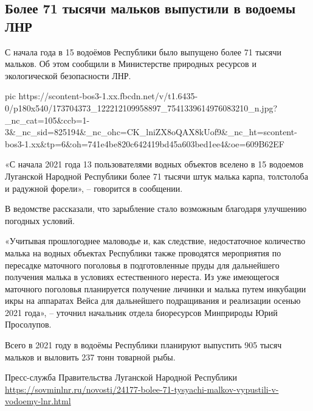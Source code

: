  
 
 
 
 

\subsection{Более 71 тысячи мальков выпустили в водоемы ЛНР}
\label{sec:14_04_2021.fb.respublikalnr.10.ryba_priroda}

С начала года в 15 водоёмов Республики было выпущено более 71 тысячи мальков.
Об этом сообщили в Министерстве природных ресурсов и экологической безопасности
ЛНР.

\ifcmt
  pic https://scontent-bos3-1.xx.fbcdn.net/v/t1.6435-0/p180x540/173704373_122212109958897_7541339614976083210_n.jpg?_nc_cat=105&ccb=1-3&_nc_sid=825194&_nc_ohc=CK_lniZX8oQAX8kUof9&_nc_ht=scontent-bos3-1.xx&tp=6&oh=741e4be820c642419bd45a603bed1ee4&oe=609B62EF
\fi

«С начала 2021 года 13 пользователями водных объектов вселено в 15 водоемов
Луганской Народной Республики более 71 тысячи штук малька карпа, толстолоба и
радужной форели», – говорится в сообщении.

В ведомстве рассказали, что зарыбление стало возможным благодаря улучшению погодных условий.

«Учитывая прошлогоднее маловодье и, как следствие, недостаточное количество
малька на водных объектах Республики также проводятся мероприятия по пересадке
маточного поголовья в подготовленные пруды для дальнейшего получения малька в
условиях естественного нереста. Из уже имеющегося маточного поголовья
планируется получение личинки и малька путем инкубации икры на аппаратах Вейса
для дальнейшего подращивания и реализации осенью 2021 года», – уточнил
начальник отдела биоресурсов Минприроды Юрий Просолупов.

Всего в 2021 году в водоёмы Республики планируют выпустить 905 тысяч мальков и
выловить 237 тонн товарной рыбы.

Пресс-служба Правительства Луганской Народной Республики
\url{https://sovminlnr.ru/novosti/24177-bolee-71-tysyachi-malkov-vypustili-v-vodoemy-lnr.html}
